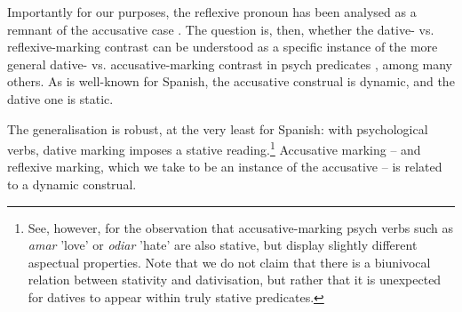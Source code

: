 \documentclass[output=paper,colorlinks,citecolor=brown,nonflat]{langsci/langscibook}
\begin{document}
\ea%
    \label{ex:fabregas:6}
    \z
\z

Importantly for our purposes, the reflexive pronoun has been analysed as a remnant of the accusative case \citep{Medová2009}. The question is, then, whether the dative- vs. reflexive-marking contrast can be understood as a specific instance of the more general dative- vs. accusative-marking contrast in psych predicates \citep{FernándezOrdóñez1999, Landau2010, CifuentesHonrubia2015, FábregasJiménezFernándezTubinoBlanco2017}, among many others. As is well-known for Spanish, the accusative construal is dynamic, and the dative one is static.

\ea%
    \label{ex:fabregas:7}
    \z
\z

\ea%
    \label{ex:fabregas:8}
    \z
\z

The generalisation is robust, at the very least for Spanish: with psychological verbs, dative marking imposes a stative reading.\footnote{See, however, \citet{FábregasMarín2015} for the observation that accusative-marking psych verbs such as \textit{amar} 'love' or \textit{odiar} 'hate' are also stative, but display slightly different aspectual properties. Note that we do not claim that there is a biunivocal relation between stativity and dativisation, but rather that it is unexpected for datives to appear within truly stative predicates.} Accusative marking – and reflexive marking, which we take to be an instance of the accusative – is related to a dynamic construal. 
\end{document}

